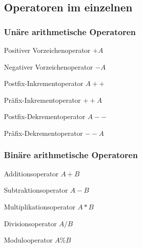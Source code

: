 			\subsection{Operatoren im einzelnen}
				\begin{minipage}[t]{9 cm}
					\subsubsection{Unäre arithmetische Operatoren}
						\begin{compactitem}
							\item Positiver Vorzeichenoperator $+A$
							\item Negativer Vorzeichenoperator $-A$
							\item Postfix-Inkrementoperator $A++$
							\item Präfix-Inkrementoperator $++A$
							\item Postfix-Dekrementoperator $A- -$
							\item Präfix-Dekrementoperator $- -A$
						\end{compactitem}
				\end{minipage}
				\hspace*{0.5cm}
				\begin{minipage}[t]{9 cm}
					\subsubsection{Binäre arithmetische Operatoren}
						\begin{compactitem}
							\item Additionsoperator $A + B$
							\item Subtraktionsoperator $A - B$
							\item Multiplikationsoperator $A * B$
							\item Divisionsoperator $A / B$
							\item Modulooperator $A \% B$   
						\end{compactitem}	
				\end{minipage}\\\\
